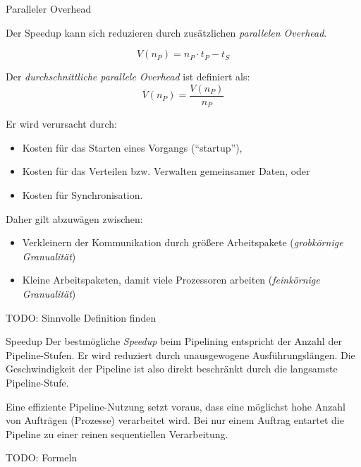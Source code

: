 \begin{defi}{Paralleler Overhead}
    
    Der Speedup kann sich reduzieren durch zusätzlichen \emph{parallelen Overhead}.
    
    \[
        V(n_P) = n_P \cdot t_P - t_S
    \]
    
    Der \emph{durchschnittliche parallele Overhead} ist definiert als:
    \[
        \overline{V}(n_P) = \frac{V(n_P)}{n_P}
    \]
    
    Er wird verursacht durch:
    \begin{itemize}
        \item Kosten für das Starten eines Vorgangs (\enquote{startup}),
        \item Kosten für das Verteilen bzw. Verwalten gemeinsamer Daten, oder
        \item Kosten für Synchronisation.
    \end{itemize}
    
    Daher gilt abzuwägen zwischen:
    \begin{itemize}
        \item Verkleinern der Kommunikation durch größere Arbeitspakete (\emph{grobkörnige Granualität})
        \item Kleine Arbeitspaketen, damit viele Prozessoren arbeiten (\emph{feinkörnige Granualität})
    \end{itemize}
    
    TODO: Sinnvolle Definition finden
\end{defi}



\begin{defi}[Pipelining]{Speedup}
    Der bestmögliche \emph{Speedup} beim Pipelining entspricht der Anzahl der Pipeline-Stufen.
    Er wird reduziert durch unausgewogene Ausführungslängen.
    Die Geschwindigkeit der Pipeline ist also direkt beschränkt durch die langsamste Pipeline-Stufe.
    
    Eine effiziente Pipeline-Nutzung setzt voraus, dass eine möglichst hohe Anzahl von Aufträgen (Prozesse) verarbeitet wird.
    Bei nur einem Auftrag entartet die Pipeline zu einer reinen sequentiellen Verarbeitung.
    
    TODO: Formeln
\end{defi}

